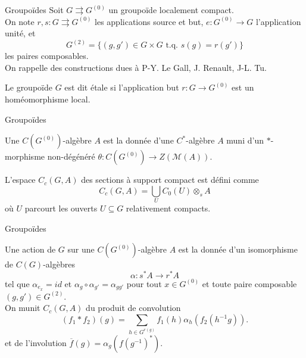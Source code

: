 \begin{frame}{Groupoïdes}
Soit $G \rightrightarrows G^{(0)} $ un groupoïde localement compact.\\
\vspace{0.3 cm}
On note $r,s:G \rightrightarrows G^{(0)}$ les applications source et but, $e : G^{(0)} \rightarrow G$ l'application unité, et 
\[G^{(2)} = \{(g,g') \in G\times G \text{ t.q. } s(g)=r(g')\}\]
les paires composables.\\
\vspace{0.3 cm}
On rappelle des constructions dues à P-Y. Le Gall, J. Renault, J-L. Tu.
\vspace{0.3 cm}
\begin{definitionfr}
Le groupoïde $G$ est dit étale si l'application but $r : G \rightarrow G^{(0)} $ est un homéomorphisme local.
\end{definitionfr}

\end{frame}

\begin{frame}{Groupoïdes}

Une $C(G^{(0)})$-algèbre $A$ est la donnée d'une $C^*$-algèbre $A$ muni d'un $*$-morphisme non-dégénéré $\theta : C(G^{(0)}) \rightarrow Z(\mathcal M(A))$.\\ 

\begin{definitionfr}
L'espace $C_c(G,A)$ des sections à support compact est défini comme
\[C_c(G,A) = \bigcup_U C_0(U)\otimes_s A\]
où $U$ parcourt les ouverts $U\subseteq G$ relativement compacts.
\end{definitionfr}

\end{frame}

\begin{frame}{Groupoïdes}

Une action de $G$ sur une $C(G^{(0)})$-algèbre $A$ est la donnée d'un isomorphisme de $C(G)$-algèbres 
\[\alpha : s^* A \rightarrow r^* A\]
tel que $\alpha_{e_x} = id$ et $\alpha_g \circ \alpha_{g'}  = \alpha_{gg'}$ pour tout $x\in G^{(0)}$ et toute paire composable $(g,g') \in G^{(2)}$.\\ 
\vspace{0.3 cm}
On munit $C_c(G,A)$ du produit de convolution 
\[(f_1\ast f_2)(g) = \sum_{h\in G^{r(g)}} f_1(h) \alpha_h(f_2(h^{-1}g)).\]
et de l'involution $\overline f(g)=\alpha_g(f(g^{-1})^*)$.\\

\end{frame}

